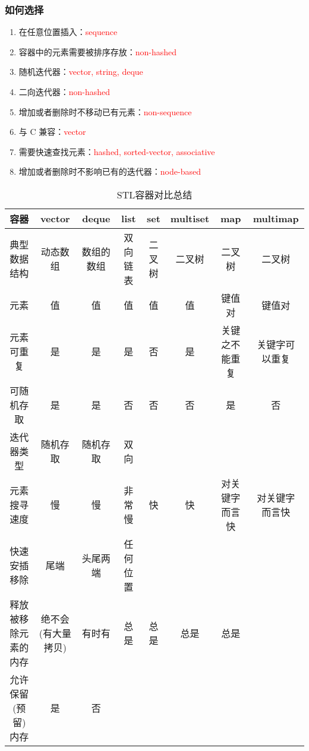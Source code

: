 \documentclass[cn,geye,blue,14pt,normal]{elegantnote}
\begin{document}
\subsubsection{如何选择}
\begin{enumerate}
  \item 在任意位置插入：\textcolor{red}{sequence}
  \item 容器中的元素需要被排序存放：\textcolor{red}{non-hashed}
  \item 随机迭代器：\textcolor{red}{vector, string, deque}
  \item 二向迭代器：\textcolor{red}{non-hashed} 
  \item 增加或者删除时不移动已有元素：\textcolor{red}{non-sequence}
  \item 与 C 兼容：\textcolor{red}{vector} 
  \item 需要快速查找元素：\textcolor{red}{hashed, sorted-vector, associative} 
  \item 增加或者删除时不影响已有的迭代器：\textcolor{red}{node-based}
\end{enumerate}

\begin{table}[htbp]
  \centering
  \scriptsize
  \caption{STL容器对比总结}
  \begin{tabular}{*{8}{>{\scriptsize}c}}
    \toprule
       容器               & vector  & deque  & list & set & multiset & map & multimap \\
    \midrule
    典型数据结构          & 动态数组 & 数组的数组 & 双向链表 & 二叉树 & 二叉树 & 二叉树 &二叉树 \\
    元素                  & 值 & 值 & 值 & 值 & 值 & 键值对 & 键值对 \\
    元素可重复            & 是 & 是 & 是 & 否 & 是 & 关键之不能重复 & 关键字可以重复 \\
    可随机存取            & 是 & 是 & 否 & 否 & 否 & 是 & 否 \\
    迭代器类型            & 随机存取 & 随机存取 & 双向 & & & & \\
    元素搜寻速度          & 慢 & 慢 & 非常慢 & 快 & 快 & 对关键字而言快 & 对关键字而言快 \\
    快速安插移除          & 尾端 & 头尾两端 & 任何位置 & & & & \\
    释放被移除元素的内存   &绝不会(有大量拷贝) & 有时有 & 总是 & 总是 & 总是 & 总是 & \\
    允许保留(预留)内存    & 是 & 否 & & & & & \\
    \bottomrule
  \end{tabular}%
\end{table}%
\end{document}
